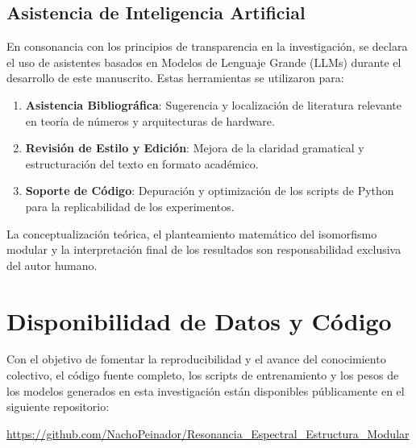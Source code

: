 \documentclass[12pt, a4paper]{article}
\theoremstyle{plain}
\theoremstyle{definition}
\begin{document}
\subsection*{Asistencia de Inteligencia Artificial}
En consonancia con los principios de transparencia en la investigación, se declara el uso de asistentes basados en Modelos de Lenguaje Grande (LLMs) durante el desarrollo de este manuscrito. Estas herramientas se utilizaron para:
\begin{enumerate}
    \item \textbf{Asistencia Bibliográfica}: Sugerencia y localización de literatura relevante en teoría de números y arquitecturas de hardware.
    \item \textbf{Revisión de Estilo y Edición}: Mejora de la claridad gramatical y estructuración del texto en formato académico.
    \item \textbf{Soporte de Código}: Depuración y optimización de los scripts de Python para la replicabilidad de los experimentos.
\end{enumerate}
La conceptualización teórica, el planteamiento matemático del isomorfismo modular y la interpretación final de los resultados son responsabilidad exclusiva del autor humano.

\section*{Disponibilidad de Datos y Código}

Con el objetivo de fomentar la reproducibilidad y el avance del conocimiento colectivo, el código fuente completo, los scripts de entrenamiento y los pesos de los modelos generados en esta investigación están disponibles públicamente en el siguiente repositorio:

\begin{center}
    \url{https://github.com/NachoPeinador/Resonancia_Espectral_Estructura_Modular}
\end{center}
\end{document}
